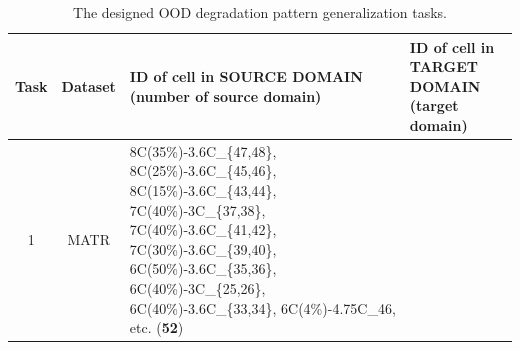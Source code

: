 \documentclass[lettersize,journal]{IEEEtran}
\begin{document}
  \begin{table}[htbp]
    \vspace{-1em}
    \footnotesize
      \centering
      \caption{The designed OOD degradation pattern generalization tasks.}
      \begin{threeparttable}
        \begin{tabularx}{\textwidth}{ccXX}
        \toprule
        Task & Dataset & ID of cell in SOURCE DOMAIN (\textbf{number of source domain}) & ID of cell in TARGET DOMAIN (\textbf{target domain}) \\
        \midrule
        1     & MATR  & 8C(35\%)-3.6C\_\{47,48\}, 8C(25\%)-3.6C\_\{45,46\}, \newline
        8C(15\%)-3.6C\_\{43,44\}, 7C(40\%)-3C\_\{37,38\}, \newline
        7C(40\%)-3.6C\_\{41,42\}, 7C(30\%)-3.6C\_\{39,40\}, \newline
        6C(50\%)-3.6C\_\{35,36\}, 6C(40\%)-3C\_\{25,26\}, \newline
        6C(40\%)-3.6C\_\{33,34\}, 6C(4\%)-4.75C\_46, \newline
        etc\tnote{a}. (\textbf{52})

\end{tabularx}
\end{threeparttable}
\end{table}
\end{document}
